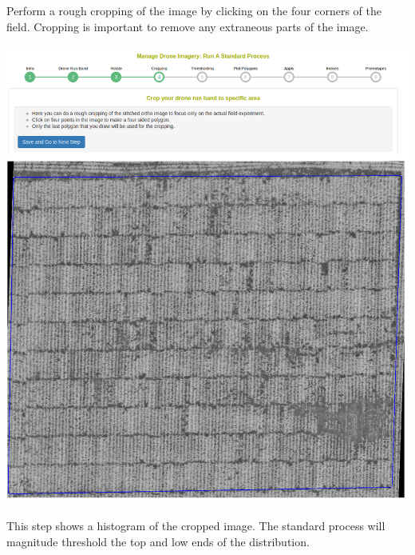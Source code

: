 \documentclass[
  12pt,
]{book}
\begin{document}
Perform a rough cropping of the image by clicking on the four corners of the field. Cropping is important to remove any extraneous parts of the image.

\begin{center}\includegraphics[width=0.95\linewidth]{assets/images/manage_image_phenotyping_standard_process_cropping} \end{center}

This step shows a histogram of the cropped image. The standard process will magnitude threshold the top and low ends of the distribution.
\end{document}
